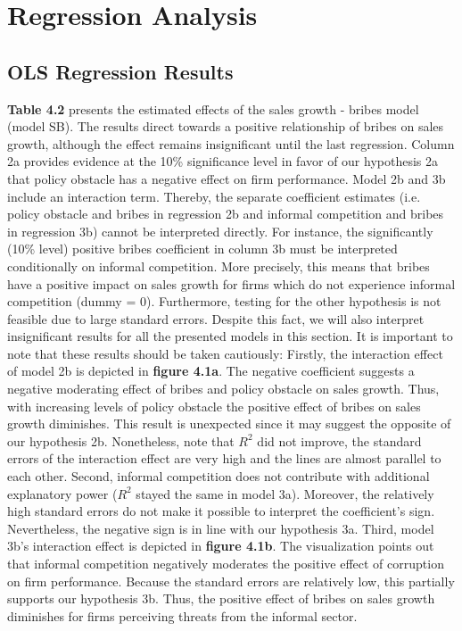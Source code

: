 \section{Regression Analysis}
\subsection{OLS Regression Results}
\textbf{Table 4.2} presents the estimated effects of the sales growth - bribes model (model SB). The results direct towards a positive relationship of bribes on sales growth, although the effect remains insignificant until the last regression. Column 2a provides evidence at the 10\% significance level in favor of our hypothesis 2a that policy obstacle has a negative effect on firm performance. Model 2b and 3b include an interaction term. Thereby, the separate coefficient estimates (i.e. policy obstacle and bribes in regression 2b and informal competition and bribes in regression 3b) cannot be interpreted directly. For instance, the significantly (10\% level) positive bribes coefficient in column 3b must be interpreted conditionally on informal competition. More precisely, this means that bribes have a positive impact on sales growth for firms which do not experience informal competition (dummy = 0). Furthermore, testing for the other hypothesis is not feasible due to large standard errors. Despite this fact, we will also interpret insignificant results for all the presented models in this section.  It is important to note that these results should be taken cautiously:
Firstly, the interaction effect of model 2b is depicted in \textbf{figure 4.1a}. The negative coefficient suggests a negative moderating effect of bribes and policy obstacle on sales growth. Thus, with increasing levels of policy obstacle the positive effect of bribes on sales growth diminishes. This result is unexpected since it may suggest the opposite of our hypothesis 2b. Nonetheless, note that $R^2$ did not improve, the standard errors of the interaction effect are very high and the lines are almost parallel to each other.
Second, informal competition does not contribute with additional explanatory power ($R^2$ stayed the same in model 3a). Moreover, the relatively high standard errors do not make it possible to interpret the coefficient's sign. Nevertheless, the negative sign is in line with our hypothesis 3a.   
Third, model 3b's interaction effect is depicted in \textbf{figure 4.1b}. The visualization points out that informal competition negatively moderates the positive effect of corruption on firm performance. Because the standard errors are relatively low, this partially supports our hypothesis 3b. Thus, the positive effect of bribes on sales growth diminishes for firms perceiving threats from the informal sector.

